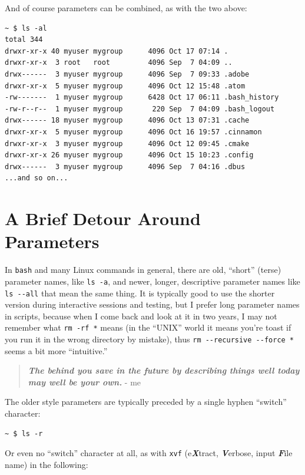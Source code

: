 \documentclass[10pt,]{book}
\numberwithin{figure}{chapter}
\begin{document}
And of course parameters can be combined, as with the two above:

\begin{verbatim}
~ $ ls -al
total 344
drwxr-xr-x 40 myuser mygroup      4096 Oct 17 07:14 .
drwxr-xr-x  3 root   root         4096 Sep  7 04:09 ..
drwx------  3 myuser mygroup      4096 Sep  7 09:33 .adobe
drwxr-xr-x  5 myuser mygroup      4096 Oct 12 15:48 .atom
-rw-------  1 myuser mygroup      6428 Oct 17 06:11 .bash_history
-rw-r--r--  1 myuser mygroup       220 Sep  7 04:09 .bash_logout
drwx------ 18 myuser mygroup      4096 Oct 13 07:31 .cache
drwxr-xr-x  5 myuser mygroup      4096 Oct 16 19:57 .cinnamon
drwxr-xr-x  3 myuser mygroup      4096 Oct 12 09:45 .cmake
drwxr-xr-x 26 myuser mygroup      4096 Oct 15 10:23 .config
drwx------  3 myuser mygroup      4096 Sep  7 04:16 .dbus
...and so on...
\end{verbatim}

\section{A Brief Detour Around
Parameters}\label{a-brief-detour-around-parameters}

In \texttt{bash} and many Linux commands in general, there are old,
``short'' (terse) parameter names, like \texttt{ls -a}, and newer,
longer, descriptive parameter names like \texttt{ls -{}-all} that mean
the same thing. It is typically good to use the shorter version during
interactive sessions and testing, but I prefer long parameter names in
scripts, because when I come back and look at it in two years, I may not
remember what \texttt{rm -rf *} means (in the ``UNIX'' world it means
you're toast if you run it in the wrong directory by mistake), thus
\texttt{rm -{}-recursive -{}-force *} seems a bit more ``intuitive.''

\begin{quote}
\textbf{\emph{The behind you save in the future by describing things
well today may well be your own.}} - me
\end{quote}

The older style parameters are typically preceded by a single hyphen
``switch'' character:

\begin{verbatim}
~ $ ls -r
\end{verbatim}

Or even no ``switch'' character at all, as with \texttt{xvf}
(e\textbf{\emph{X}}tract, \textbf{\emph{V}}erbose, input
\textbf{\emph{F}}ile name) in the following:
\end{document}
